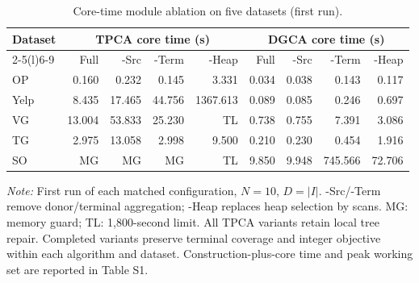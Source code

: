 \begin{table}[t]
\centering
\caption{Core-time module ablation on five datasets (first run).}
\label{tab:T06_module_ablation_r1}
\small
\setlength{\tabcolsep}{4pt}
\begin{tabular*}{\textwidth}{@{\extracolsep{\fill}}lrrrrrrrr@{}}
\toprule
\multirow{2}{*}{Dataset} & \multicolumn{4}{c}{TPCA core time (s)} & \multicolumn{4}{c}{DGCA core time (s)} \\
\cmidrule(lr){2-5}\cmidrule(l){6-9}
 & Full & -Src & -Term & -Heap & Full & -Src & -Term & -Heap \\
\midrule
OP & 0.160 & 0.232 & 0.145 & 3.331 & 0.034 & 0.038 & 0.143 & 0.117 \\
Yelp & 8.435 & 17.465 & 44.756 & 1367.613 & 0.089 & 0.085 & 0.246 & 0.697 \\
VG & 13.004 & 53.833 & 25.230 & TL & 0.738 & 0.755 & 7.391 & 3.086 \\
TG & 2.975 & 13.058 & 2.998 & 9.500 & 0.210 & 0.230 & 0.454 & 1.916 \\
SO & MG & MG & MG & TL & 9.850 & 9.948 & 745.566 & 72.706 \\
\bottomrule
\end{tabular*}
\par\smallskip
\begin{minipage}{.98\textwidth}\footnotesize
\textit{Note:} First run of each matched configuration, $N=10$, $D=|I|$. -Src/-Term remove donor/terminal aggregation; -Heap replaces heap selection by scans. MG: memory guard; TL: 1,800-second limit. All TPCA variants retain local tree repair. Completed variants preserve terminal coverage and integer objective within each algorithm and dataset. Construction-plus-core time and peak working set are reported in Table S1.
\end{minipage}
\end{table}
